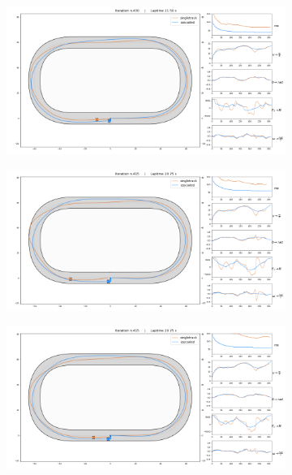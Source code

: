 \documentclass[a4paper, onecolumn, 12pt]{article}
\begin{document}
\begin{figure}[H]
    \captionsetup[subfigure]{justification=centering}
    \centering
    \begin{subfigure}{0.8\textwidth}
        \centering
        \includegraphics[width=\textwidth]{assets/im/race1.png}
        \label{race1}
    \end{subfigure}
    \begin{subfigure}{0.8\textwidth}
        \centering
        \includegraphics[width=\textwidth]{assets/im/race7.png}
        \label{race7}
    \end{subfigure}
    \begin{subfigure}{0.8\textwidth}
        \centering
        \includegraphics[width=\textwidth]{assets/im/race5.png}

\end{subfigure}
\end{figure}
\end{document}
